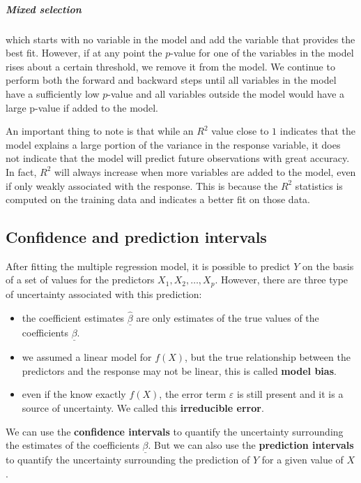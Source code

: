 \subparagraph*{Mixed selection} which starts with no variable in the model and add the variable that provides the best fit. However, if at any point the $p$-value for one of the variables in the model rises about a certain threshold, we remove it from the model. We continue to perform both the forward and backward steps until all variables in the model have a sufficiently low $p$-value and all variables outside the model would have a large p-value if added to the model.

An important thing to note is that while an $R^2$ value close to $1$ indicates that the model explains a large portion of the variance in the response variable, it does not indicate that the model will predict future observations with great accuracy. In fact, $R^2$ will always increase when more variables are added to the model, even if only weakly associated with the response. This is because the $R^2$ statistics is computed on the training data and indicates a better fit on those data.


\subsection*{Confidence and prediction intervals}
After fitting the multiple regression model, it is possible to predict $Y$ on the basis of a set of values for the predictors $X_1, X_2, \dots, X_p$. However, there are three type of uncertainty associated with this prediction:
\begin{itemize}
    \item the coefficient estimates $\hat{\underline\beta}$ are only estimates of the true values of the coefficients $\underline\beta$.
    \item we assumed a linear model for $f(X)$, but the true relationship between the predictors and the response may not be linear, this is called \textbf{model bias}.
    \item even if the know exactly $f(X)$, the error term $\varepsilon$ is still present and it is a source of uncertainty. We called this \textbf{irreducible error}.
\end{itemize}

We can use the \textbf{confidence intervals} to quantify the uncertainty surrounding the estimates of the coefficients $\underline\beta$.
But we can also use the \textbf{prediction intervals} to quantify the uncertainty surrounding the prediction of $Y$ for a given value of $X$.

